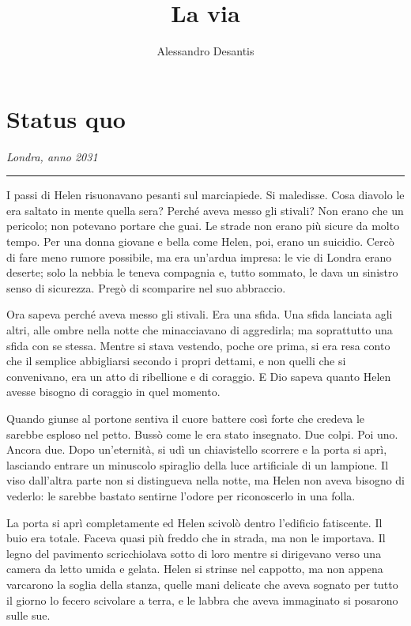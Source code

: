 \documentclass[a4paper,oneside,11pt]{memoir}
\title{La via}
\author{Alessandro Desantis}
\date{}
\begin{document}
\begin{titlingpage}
\maketitle
\end{titlingpage}

\chapter{Status quo}

\emph{Londra, anno 2031}
\plainbreak{1}

I passi di Helen risuonavano pesanti sul marciapiede. Si maledisse. Cosa diavolo le era saltato in
mente quella sera? Perché aveva messo gli stivali? Non erano che un pericolo; non potevano portare
che guai. Le strade non erano più sicure da molto tempo. Per una donna giovane e bella come Helen,
poi, erano un suicidio. Cercò di fare meno rumore possibile, ma era un'ardua impresa: le vie di
Londra erano deserte; solo la nebbia le teneva compagnia e, tutto sommato, le dava un sinistro senso
di sicurezza. Pregò di scomparire nel suo abbraccio.

Ora sapeva perché aveva messo gli stivali. Era una sfida. Una sfida lanciata agli altri, alle ombre
nella notte che minacciavano di aggredirla; ma soprattutto una sfida con se stessa. Mentre si stava
vestendo, poche ore prima, si era resa conto che il semplice abbigliarsi secondo i propri dettami, e
non quelli che si convenivano, era un atto di ribellione e di coraggio. E Dio sapeva quanto Helen
avesse bisogno di coraggio in quel momento.

Quando giunse al portone sentiva il cuore battere così forte che credeva le sarebbe esploso nel
petto. Bussò come le era stato insegnato. Due colpi. Poi uno. Ancora due. Dopo un'eternità, si udì
un chiavistello scorrere e la porta si aprì, lasciando entrare un minuscolo spiraglio della luce
artificiale di un lampione. Il viso dall'altra parte non si distingueva nella notte, ma Helen non
aveva bisogno di vederlo: le sarebbe bastato sentirne l'odore per riconoscerlo in una folla.

La porta si aprì completamente ed Helen scivolò dentro l'edificio fatiscente. Il buio era totale.
Faceva quasi più freddo che in strada, ma non le importava. Il legno del pavimento scricchiolava
sotto di loro mentre si dirigevano verso una camera da letto umida e gelata. Helen si strinse nel
cappotto, ma non appena varcarono la soglia della stanza, quelle mani delicate che aveva sognato per
tutto il giorno lo fecero scivolare a terra, e le labbra che aveva immaginato si posarono sulle sue.
\end{document}
